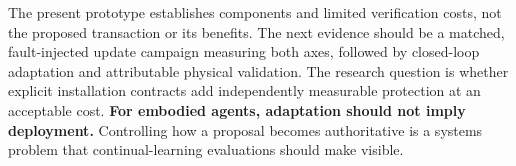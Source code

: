 \documentclass{article}
\begin{document}
The present prototype establishes components and limited verification costs, not the proposed transaction or its benefits. The next evidence should be a matched, fault-injected update campaign measuring both axes, followed by closed-loop adaptation and attributable physical validation. The research question is whether explicit installation contracts add independently measurable protection at an acceptable cost. \textbf{For embodied agents, adaptation should not imply deployment.} Controlling how a proposal becomes authoritative is a systems problem that continual-learning evaluations should make visible.

\clearpage


\end{document}
